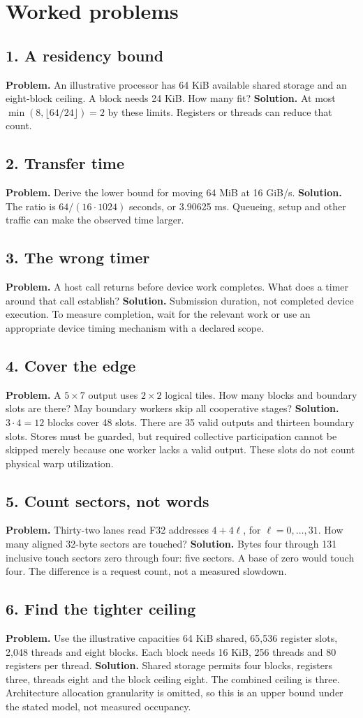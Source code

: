 \section{Worked problems}
\subsection*{1. A residency bound}
\textbf{Problem.} An illustrative processor has 64 KiB available shared
storage and an eight-block ceiling. A block needs 24 KiB. How many fit?
\textbf{Solution.} At most $\min(8,\lfloor64/24\rfloor)=2$ by these limits.
Registers or threads can reduce that count.
\subsection*{2. Transfer time}
\textbf{Problem.} Derive the lower bound for moving 64 MiB at 16 GiB/s.
\textbf{Solution.} The ratio is $64/(16\cdot1024)$ seconds, or 3.90625 ms.
Queueing, setup and other traffic can make the observed time larger.
\subsection*{3. The wrong timer}
\textbf{Problem.} A host call returns before device work completes. What
does a timer around that call establish?
\textbf{Solution.} Submission duration, not completed device execution.
To measure completion, wait for the relevant work or use an appropriate
device timing mechanism with a declared scope.
\subsection*{4. Cover the edge}
\textbf{Problem.} A $5\times7$ output uses $2\times2$ logical tiles.
How many blocks and boundary slots are there? May boundary workers
skip all cooperative stages?
\textbf{Solution.} $3\cdot4=12$ blocks cover 48 slots. There are
35 valid outputs and thirteen boundary slots. Stores must be
guarded, but required collective participation cannot be skipped
merely because one worker lacks a valid output. These slots do
not count physical warp utilization.
\subsection*{5. Count sectors, not words}
\textbf{Problem.} Thirty-two lanes read F32 addresses $4+4\ell$,
for $\ell=0,\ldots,31$. How many aligned 32-byte sectors are touched?
\textbf{Solution.} Bytes four through 131 inclusive touch sectors
zero through four: five sectors. A base of zero would touch four.
The difference is a request count, not a measured slowdown.
\subsection*{6. Find the tighter ceiling}
\textbf{Problem.} Use the illustrative capacities 64 KiB shared,
65,536 register slots, 2,048 threads and eight blocks. Each block
needs 16 KiB, 256 threads and 80 registers per thread.
\textbf{Solution.} Shared storage permits four blocks, registers three,
threads eight and the block ceiling eight. The combined ceiling is
three. Architecture allocation granularity is omitted, so this is
an upper bound under the stated model, not measured occupancy.
